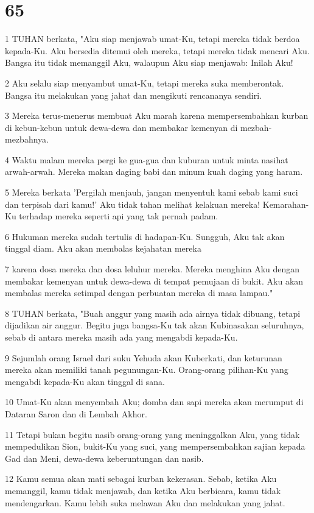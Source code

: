 \chapter{65}

\par 1 TUHAN berkata, "Aku siap menjawab umat-Ku, tetapi mereka tidak berdoa kepada-Ku. Aku bersedia ditemui oleh mereka, tetapi mereka tidak mencari Aku. Bangsa itu tidak memanggil Aku, walaupun Aku siap menjawab: Inilah Aku!
\par 2 Aku selalu siap menyambut umat-Ku, tetapi mereka suka memberontak. Bangsa itu melakukan yang jahat dan mengikuti rencananya sendiri.
\par 3 Mereka terus-menerus membuat Aku marah karena mempersembahkan kurban di kebun-kebun untuk dewa-dewa dan membakar kemenyan di mezbah-mezbahnya.
\par 4 Waktu malam mereka pergi ke gua-gua dan kuburan untuk minta nasihat arwah-arwah. Mereka makan daging babi dan minum kuah daging yang haram.
\par 5 Mereka berkata 'Pergilah menjauh, jangan menyentuh kami sebab kami suci dan terpisah dari kamu!' Aku tidak tahan melihat kelakuan mereka! Kemarahan-Ku terhadap mereka seperti api yang tak pernah padam.
\par 6 Hukuman mereka sudah tertulis di hadapan-Ku. Sungguh, Aku tak akan tinggal diam. Aku akan membalas kejahatan mereka
\par 7 karena dosa mereka dan dosa leluhur mereka. Mereka menghina Aku dengan membakar kemenyan untuk dewa-dewa di tempat pemujaan di bukit. Aku akan membalas mereka setimpal dengan perbuatan mereka di masa lampau."
\par 8 TUHAN berkata, "Buah anggur yang masih ada airnya tidak dibuang, tetapi dijadikan air anggur. Begitu juga bangsa-Ku tak akan Kubinasakan seluruhnya, sebab di antara mereka masih ada yang mengabdi kepada-Ku.
\par 9 Sejumlah orang Israel dari suku Yehuda akan Kuberkati, dan keturunan mereka akan memiliki tanah pegunungan-Ku. Orang-orang pilihan-Ku yang mengabdi kepada-Ku akan tinggal di sana.
\par 10 Umat-Ku akan menyembah Aku; domba dan sapi mereka akan merumput di Dataran Saron dan di Lembah Akhor.
\par 11 Tetapi bukan begitu nasib orang-orang yang meninggalkan Aku, yang tidak mempedulikan Sion, bukit-Ku yang suci, yang mempersembahkan sajian kepada Gad dan Meni, dewa-dewa keberuntungan dan nasib.
\par 12 Kamu semua akan mati sebagai kurban kekerasan. Sebab, ketika Aku memanggil, kamu tidak menjawab, dan ketika Aku berbicara, kamu tidak mendengarkan. Kamu lebih suka melawan Aku dan melakukan yang jahat.
